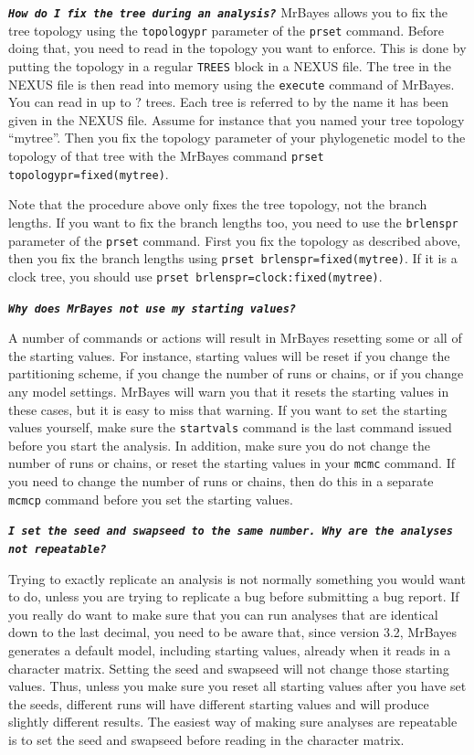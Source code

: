 \documentclass[12pt]{book}
\newcommand{\ttt}[1]{\texttt{#1}}
\newcommand{\tb}[1]{\ttt{\textbf{#1}}}
\begin{document}
\tb{\it{How do I fix the tree during an analysis?}}
MrBayes allows you to fix the tree topology using the \ttt{topologypr} parameter of the \ttt{prset}
command. Before doing that, you need to read in the topology you want to enforce. This is done by
putting the topology in a regular \ttt{TREES} block in a NEXUS file. The tree in the NEXUS file is
then read into memory using the \ttt{execute} command of MrBayes. You can read in up to $?$ trees.
Each tree is referred to by the name it has been given in the NEXUS file. Assume for instance that
you named your tree topology ``mytree''. Then you fix the topology parameter of your phylogenetic
model to the topology of that tree with the MrBayes command \ttt{prset topologypr=fixed(mytree)}.

Note that the procedure above only fixes the tree topology, not the branch lengths. If you want to
fix the branch lengths too, you need to use the \ttt{brlenspr} parameter of the \ttt{prset}
command. First you fix the topology as described above, then you fix the branch lengths using
\ttt{prset brlenspr=fixed(mytree)}. If it is a clock tree, you should use \ttt{prset
brlenspr=clock:fixed(mytree)}.

\tb{\it{Why does MrBayes not use my starting values?}}

A number of commands or actions will result in MrBayes resetting some or all of the starting
values. For instance, starting values will be reset if you change the partitioning scheme, if you
change the number of runs or chains, or if you change any model settings. MrBayes will warn you
that it resets the starting values in these cases, but it is easy to miss that warning. If you want
to set the starting values yourself, make sure the \ttt{startvals} command is the last command
issued before you start the analysis. In addition, make sure you do not change the number of runs
or chains, or reset the starting values in your \ttt{mcmc} command. If you need to change the
number of runs or chains, then do this in a separate \ttt{mcmcp} command before you set the
starting values.

\tb{\it{I set the seed and swapseed to the same number. Why are the analyses not repeatable?}}

Trying to exactly replicate an analysis is not normally something you would want to do, unless you
are trying to replicate a bug before submitting a bug report. If you really do want to make sure
that you can run analyses that are identical down to the last decimal, you need to be aware that,
since version 3.2, MrBayes generates a default model, including starting values, already when it
reads in a character matrix. Setting the seed and swapseed will not change those starting values.
Thus, unless you make sure you reset all starting values after you have set the seeds, different
runs will have different starting values and will produce slightly different results. The easiest
way of making sure analyses are repeatable is to set the seed and swapseed before reading in the
character matrix.
\end{document}
